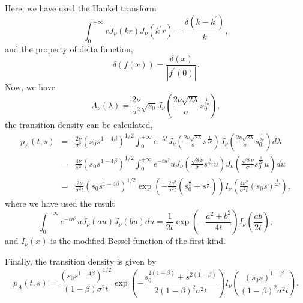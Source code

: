 \documentclass[12pt]{article}
\begin{document}
  Here, we have used the Hankel transform
  \begin{equation}
    \int_0^{+\infty}rJ_{\nu}(kr)J_{\nu}(k^{\prime}r)=\frac{\delta(k-k^{\prime})}{k},
  \end{equation}
  and the property of delta function,
  \begin{equation}
    \delta\left(f(x)\right)=\frac{\delta(x)}{|f^{\prime}(0)|}.
  \end{equation}
  Now, we have
  $$
    A_{\nu}(\lambda)=\frac{2\nu}{\sigma^2}\sqrt{s_0}J_{\nu}\left(\frac{2\nu\sqrt{2\lambda}}{\sigma}s_0^{\frac{1}{2\nu}}\right),
  $$
  the transition density can be calculated,
  \begin{eqnarray}
    p_A(t,s) &=& \frac{2\nu}{\sigma^2}\left(s_0s^{1-4\beta}\right)^{1/2}\int_0^{+\infty}e^{-\lambda t}
                J_{\nu}\left(\frac{2\nu\sqrt{2\lambda}}{\sigma}s^{\frac{1}{2\nu}}\right)
                J_{\nu}\left(\frac{2\nu\sqrt{2\lambda}}{\sigma}s_0^{\frac{1}{2\nu}}\right)d\lambda\nonumber\\
           &=& \frac{4\nu}{\sigma^2}\left(s_0s^{1-4\beta}\right)^{1/2}\int_0^{+\infty}e^{-tu^2} u
                J_{\nu}\left(\frac{\sqrt{8}\nu}{\sigma}s^{\frac{1}{2\nu}}u\right)
                J_{\nu}\left(\frac{\sqrt{8}\nu}{\sigma}s_0^{\frac{1}{2\nu}}u\right)du\nonumber\\
           &=& \frac{2\nu}{\sigma^2t}\left(s_0s^{1-4\beta}\right)^{1/2}
               \exp\left(-\frac{2\nu^2}{\sigma^2t}\left(s_0^{\frac{1}{\nu}}+s^{\frac{1}{\nu}}\right)\right)
               I_{\nu}\left(\frac{4\nu^2}{\sigma^2t}\left(s_0s\right)^{\frac{1}{2\nu}}\right),
    \label{density1}
  \end{eqnarray}
  where we have used the result \cite{DLMF1}
  \begin{equation}
    \int_0^{+\infty}e^{-tu^2}uJ_{\nu}(au)J_{\nu}(bu)du=\frac{1}{2t}\exp\left(-\frac{a^2+b^2}{4t}\right)I_{\nu}\left(\frac{ab}{2t}\right),
  \end{equation}
  and $I_{\nu}(x)$ is the modified Bessel function of the first kind.

  Finally, the transition density is given by
  \begin{equation}
    p_A(t,s)=\frac{\left(s_0s^{1-4\beta}\right)^{1/2}}{(1-\beta)\sigma^2t}
    \exp\left(-\frac{s_0^{2(1-\beta)}+s^{2(1-\beta)}}{2(1-\beta)^2\sigma^2t}\right)
    I_{\nu}\left(\frac{\left(s_0s\right)^{1-\beta}}{(1-\beta)^2\sigma^2t}\right).
    \label{pA}
  \end{equation}
\end{document}
